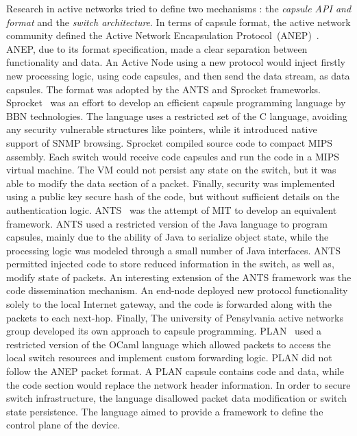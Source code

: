 Research in active networks tried to define two mechanisms : the {\it capsule
  API and format} and the {\it switch architecture}. In terms of capsule
format, the active network community defined the Active Network Encapsulation
Protocol~(ANEP)~\cite{alexander1997}.  ANEP, due to its format specification,
made a clear separation between functionality and data. An Active Node using a
new protocol would inject firstly new processing logic, using code capsules, and then
send the data stream, as data capsules.  The format was adopted by the ANTS and
Sprocket frameworks.  Sprocket~\cite{Schwartz200} was an effort to develop an
efficient capsule programming language by BBN technologies. The language uses a
restricted set of the C language, avoiding any security vulnerable structures
like pointers, while it introduced native support of SNMP browsing. Sprocket
compiled source code to compact MIPS assembly. Each switch would receive code
capsules and run the code in a MIPS virtual machine. The VM could not persist
any state on the switch, but it was able to modify the data section of a packet.
Finally, security was implemented using a public key secure hash of the code,
but without sufficient details on the authentication logic.
ANTS~\cite{Wetherall1998} was the attempt of MIT to develop an equivalent
framework. ANTS used a restricted version of the Java language to program
capsules, mainly due to the ability of Java to serialize object state, while
the processing logic was modeled through a small number of Java interfaces. ANTS
permitted injected code to store reduced information in the switch, as
well as, modify state of packets. An interesting extension of the ANTS framework
was the code dissemination mechanism. An
end-node deployed new protocol functionality solely to the local Internet
gateway, and the code is forwarded along with the packets to each
next-hop. Finally, The university of Pensylvania active networks group developed
its own approach to capsule programming.  PLAN~\cite{Hicks1998} used a restricted
version of the OCaml language which allowed packets to access the local switch
resources and implement custom forwarding logic. PLAN did not follow the ANEP
packet format. A PLAN capsule contains
code and data, while the code section would replace the network header
information. In order to secure switch infrastructure, the language
disallowed  packet data modification or switch state persistence. The language 
aimed to provide a framework to define the control plane of the device.


